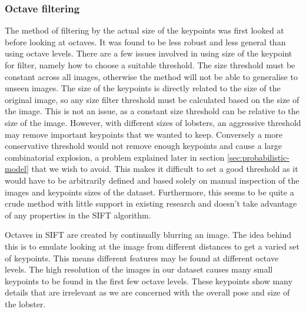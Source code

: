 \subsubsection{Octave filtering}
The method of filtering by the actual size of the keypoints was first looked at before looking at octaves. It was found to be less robust and less general than using octave levels. There are a few issues involved in using size of the keypoint for filter, namely how to choose a suitable threshold. The size threshold must be constant across all images, otherwise the method will not be able to generalise to unseen images. The size of the keypoints is directly related to the size of the original image, so any size filter threshold must be calculated based on the size of the image. This is not an issue, as a constant size threshold can be relative to the size of the image. However, with different sizes of lobsters, an aggressive threshold may remove important keypoints that we wanted to keep. Conversely a more conservative threshold would not remove enough keypoints and cause a large combinatorial explosion, a problem explained later in section \ref{sec:probabilistic-model} that we wish to avoid. This makes it difficult to set a good threshold as it would have to be arbitrarily defined and based solely on manual inspection of the images and keypoints sizes of the dataset. Furthermore, this seems to be quite a crude method with little support in existing research and doesn't take advantage of any properties in the SIFT algorithm. 

Octaves in SIFT are created by continually blurring an image. The idea behind this is to emulate looking at the image from different distances to get a varied set of keypoints. This means different features may be found at different octave levels. The high resolution of the images in our dataset causes many small keypoints to be found in the first few octave levels. These keypoints show many details that are irrelevant as we are concerned with the overall pose and size of the lobster.

